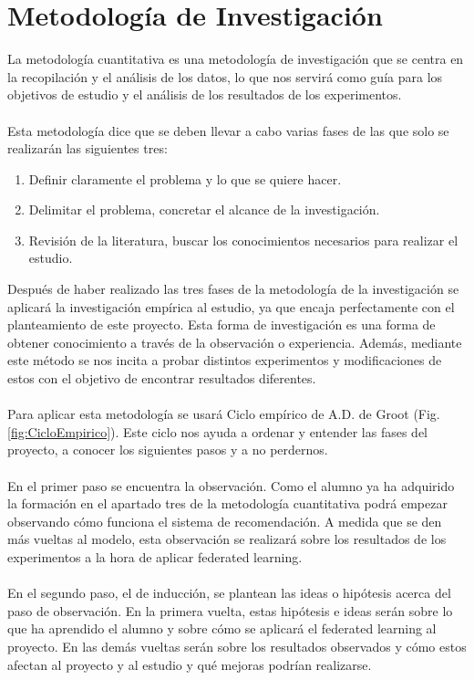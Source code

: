 \section{Metodología de Investigación}
La metodología cuantitativa es una metodología de investigación que se centra en la recopilación y el análisis de los datos, lo que nos servirá como guía para los objetivos de estudio y el análisis de los resultados de los experimentos. 
\\ \\
Esta metodología dice que se deben llevar a cabo varias fases de las que solo se realizarán las siguientes tres:
\begin{enumerate}
    \item Definir claramente el problema y lo que se quiere hacer. 
    \item Delimitar el problema, concretar el alcance de la investigación.
    \item Revisión de la literatura, buscar los conocimientos necesarios para realizar el estudio.
\end{enumerate}
Después de haber realizado las tres fases de la metodología de la investigación se aplicará la investigación empírica al estudio, ya que encaja perfectamente con el planteamiento de este proyecto. Esta forma de investigación es una forma de obtener conocimiento a través de la observación o experiencia. Además, mediante este método se nos incita a probar distintos experimentos y modificaciones de estos con el objetivo de encontrar resultados diferentes.\\ \\
Para aplicar esta metodología se usará Ciclo empírico de A.D. de Groot (Fig.\ref{fig:CicloEmpirico}). Este ciclo nos ayuda a ordenar y entender las fases del proyecto, a conocer los siguientes pasos y a no perdernos.
\\ \\
En el primer paso se encuentra la observación. Como el alumno ya ha adquirido la formación en el apartado tres de la metodología cuantitativa podrá empezar observando cómo funciona el sistema de recomendación. A medida que se den más vueltas al modelo, esta observación se realizará sobre los resultados de los experimentos a la hora de aplicar federated learning.
\\ \\
En el segundo paso, el de inducción, se plantean las ideas o hipótesis acerca del paso de observación. En la primera vuelta, estas hipótesis e ideas serán sobre lo que ha aprendido el alumno y sobre cómo se aplicará el federated learning al proyecto. En las demás vueltas serán sobre los resultados observados y cómo estos afectan al proyecto y al estudio y qué mejoras podrían realizarse. 
